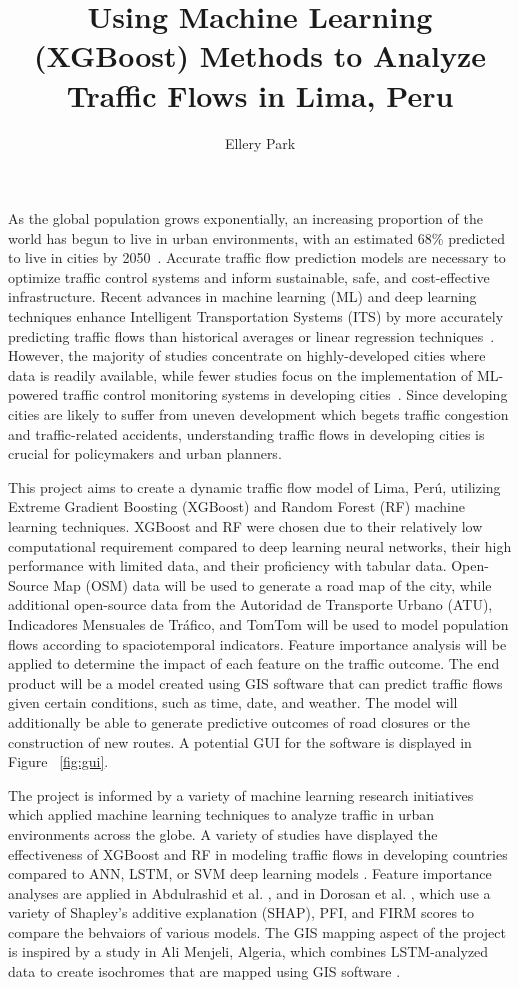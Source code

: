 \documentclass[12pt]{article}
\title{\textbf{Using Machine Learning (XGBoost) Methods to Analyze Traffic Flows in Lima, Peru}}
\author{Ellery Park}
\begin{document}
\maketitle

As the global population grows exponentially, an increasing proportion of the world has begun to live in
urban environments, with an estimated 68\% predicted to live in cities by 2050~\cite{UN_DESA}. Accurate traffic flow prediction models are necessary 
to optimize traffic control systems and inform sustainable, safe, and cost-effective infrastructure. Recent advances in machine learning (ML) and deep learning techniques 
enhance Intelligent Transportation Systems (ITS) by more accurately predicting traffic flows than historical averages or linear regression techniques~\cite{app15073866}. 
However, the majority of studies concentrate on highly-developed cities where data is readily available, while fewer studies
focus on the implementation of ML-powered traffic control monitoring systems in developing cities~\cite{Dorosan}. Since developing cities are
likely to suffer from uneven development which begets traffic congestion and traffic-related accidents, understanding traffic
flows in developing cities is crucial for policymakers and urban planners.

This project aims to create a dynamic traffic flow model of Lima, Perú, utilizing Extreme Gradient Boosting (XGBoost) and Random Forest (RF) machine learning techniques.
XGBoost and RF were chosen due to their relatively low computational requirement compared to deep learning neural networks,
their high performance with limited data, and their proficiency with tabular data. Open-Source Map (OSM) data will be used to generate a road map of the city, 
while additional open-source data from the Autoridad de Transporte Urbano (ATU),
Indicadores Mensuales de Tráfico, and TomTom will be used to model population flows according to spaciotemporal indicators.
Feature importance analysis will be applied to determine the impact of each feature on the traffic outcome.
The end product will be a model created using GIS software that can predict traffic flows given certain conditions, such as time, date, and
weather. The model will additionally be able to generate predictive outcomes of road closures or the construction of new routes. A potential GUI for the software 
is displayed in Figure ~\ref{fig:gui}.

The project is informed by a variety of machine learning research initiatives which applied machine learning techniques to analyze 
traffic in urban environments across the globe. A variety of studies have displayed the effectiveness of XGBoost and RF
in modeling traffic flows in developing countries compared to ANN, LSTM, or SVM deep learning models \cite{Dorosan, ABDULRASHID2025103969, en18071685, HAMMOUMI2025813}. 
Feature importance analyses are applied in Abdulrashid et al. \cite{ABDULRASHID2025103969}, and in 
Dorosan et al. \cite{Dorosan}, which use a variety of Shapley's additive explanation (SHAP), PFI, and FIRM scores to compare the behvaiors
of various models.
The GIS mapping aspect of the project is inspired by a study in Ali Menjeli, Algeria, which combines LSTM-analyzed data to create isochromes that are
mapped using GIS software \cite{Fenghour2025}. 
\end{document}
